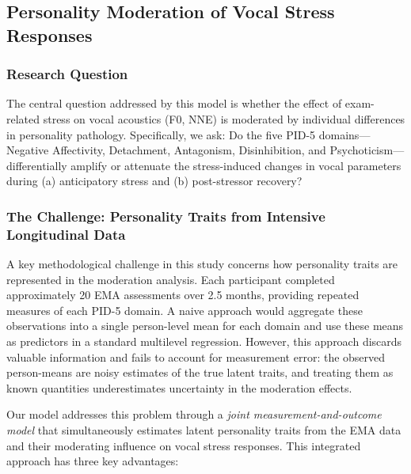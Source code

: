 \documentclass[
  english,
  man,floatsintext]{apa6}
\begin{document}
\subsection{Personality Moderation of Vocal Stress Responses}\label{personality-moderation-of-vocal-stress-responses}

\subsubsection{Research Question}\label{research-question-1}

The central question addressed by this model is whether the effect of exam-related stress on vocal acoustics (F0, NNE) is moderated by individual differences in personality pathology. Specifically, we ask: Do the five PID-5 domains---Negative Affectivity, Detachment, Antagonism, Disinhibition, and Psychoticism---differentially amplify or attenuate the stress-induced changes in vocal parameters during (a) anticipatory stress and (b) post-stressor recovery?

\subsubsection{The Challenge: Personality Traits from Intensive Longitudinal Data}\label{the-challenge-personality-traits-from-intensive-longitudinal-data}

A key methodological challenge in this study concerns how personality traits are represented in the moderation analysis. Each participant completed approximately 20 EMA assessments over 2.5 months, providing repeated measures of each PID-5 domain. A naive approach would aggregate these observations into a single person-level mean for each domain and use these means as predictors in a standard multilevel regression. However, this approach discards valuable information and fails to account for measurement error: the observed person-means are noisy estimates of the true latent traits, and treating them as known quantities underestimates uncertainty in the moderation effects.

Our model addresses this problem through a \emph{joint measurement-and-outcome model} that simultaneously estimates latent personality traits from the EMA data and their moderating influence on vocal stress responses. This integrated approach has three key advantages:
\end{document}
